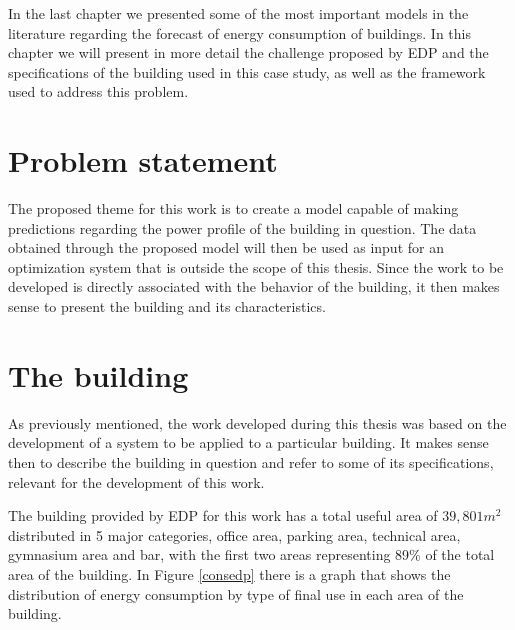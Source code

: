\cleardoublepage
\label{chap:architecture}


In the last chapter we presented some of the most important models in the literature regarding the forecast of energy consumption of buildings. In this chapter we will present in more detail the challenge proposed by \ac{EDP} and the specifications of the building used in this case study, as well as the framework used to address this problem.

\section{Problem statement}

The proposed theme for this work is to create a model capable of making predictions regarding the power profile of the building in question. The data obtained through the proposed model will then be used as input for an optimization system that is outside the scope of this thesis. Since the work to be developed is directly associated with the behavior of the building, it then makes sense to present the building and its characteristics.



\section{The building}\label{subbuild}

As previously mentioned, the work developed during this thesis was based on the development of a system to be applied to a particular building. It makes sense then to describe the building in question and refer to some of its specifications, relevant for the development of this work.

The building provided by \ac{EDP} for this work has a total useful area of $39,801m^2$ distributed in 5 major categories, office area, parking area, technical area, gymnasium area and bar, with the first two areas representing 89\% of the total area of the building. In Figure \ref{consedp} there is a graph that shows the distribution of energy consumption by type of final use in each area of the building.

